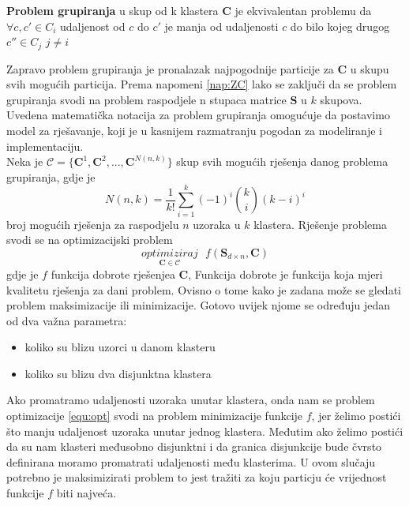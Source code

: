 \documentclass[a4paper,twoside,12pt]{memoir} %
\begin{document}
\begin{defn}
\label{def:hard-formal}
\textbf{Problem grupiranja} u skup od k klastera $\mathbf{C}$ je ekvivalentan problemu da\\
$\forall c, c' \in C_i$ udaljenost od $c$ do $c'$ je manja od udaljenosti $c$ do bilo kojeg drugog $c'' \in C_j$ $ j \neq i$ 
\end{defn}
Zapravo problem grupiranja je pronalazak najpogodnije particije za $\mathbf{C}$ u skupu svih mogućih particija.
Prema napomeni \ref{nap:ZC} lako se zaključi da se problem grupiranja svodi na problem raspodjele n stupaca matrice $\mathbf{S}$ u $k$ skupova.
Uvedena matematička notacija za problem grupiranja omogućuje da postavimo model za rješavanje, koji je u kasnijem razmatranju pogodan za modeliranje i implementaciju.\\
Neka je  $\mathcal{C} = \{ \mathbf{C}^1, \mathbf{C}^2, ..., \mathbf{C}^{N(n,k)}  \}$ skup svih mogućih rješenja danog problema grupiranja, gdje je
\begin{equation}
N(n,k) = \frac{1}{k!}\sum_{i=1}^{k}(-1)^i{{k}\choose{i}}(k-i)^i
\end{equation}
broj mogućih rješenja za raspodjelu $n$ uzoraka u $k$ klastera. Rješenje problema svodi se na optimizacijski problem
\begin{equation}
\label{equ:opt}
\underset{\mathbf{C} \in \mathcal{C}}{optimiziraj} \textbf{  }f(\mathbf{S}_{d\times n}, \mathbf{C})
\end{equation}
gdje je $f$ funkcija dobrote rješenjea $\mathbf{C}$, Funkcija dobrote je funkcija koja mjeri kvalitetu rješenja za dani problem. Ovisno o tome kako je zadana može se gledati problem maksimizacije ili minimizacije. Gotovo uvijek njome se određuju jedan od dva važna parametra:
\begin{itemize}
\item koliko su blizu uzorci u danom klasteru
\item koliko su blizu dva disjunktna klastera
\end{itemize}
Ako promatramo udaljenosti uzoraka unutar klastera, onda nam se problem optimizacije \ref*{equ:opt} svodi na problem minimizacije funkcije $f$, jer želimo postići što manju udaljenost uzoraka unutar jednog klastera. Međutim ako želimo postići da su nam klasteri međusobno disjunktni i da granica disjunkcije bude čvrsto definirana moramo promatrati udaljenosti među klasterima. U ovom slučaju potrebno je maksimizirati problem to jest tražiti za koju particju će vrijednost funkcije $f$ biti najveća. \\
\end{document}
